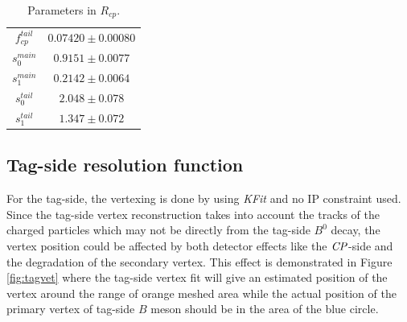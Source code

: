 \begin{table}[H]
	\begin{minipage}[b]{1.0\linewidth}
		\centering
		\caption{Parameters in $R_{cp}$.}
		\label{tab:Rcp}
		\begin{tabular}{|c|c|}
			\hline
			$f_{cp}^{tail}$ & $0.07420 \pm 0.00080$\\
			$s_0^{main}$&  $0.9151 \pm 0.0077$ \\
			$s_1^{main}$ & $0.2142\pm 0.0064$\\
			$s_0^{tail}$ &  $2.048\pm 0.078$\\
			$s_1^{tail}$  & $1.347\pm 0.072$ \\
			\hline
		\end{tabular}
	\end{minipage}
\end{table}

\subsection{Tag-side resolution function}

For the tag-side, the vertexing is done by using \textit{KFit} and no IP constraint used. Since the tag-side vertex reconstruction takes into account the tracks of the charged particles which may not be directly from the tag-side $B^0$ decay, the vertex position could be affected by both detector effects like the $\it{CP}$-side and the degradation of the secondary vertex. This effect is demonstrated in Figure \ref{fig:tagvet} where the tag-side vertex fit will give an estimated position of the vertex around the range of orange meshed area while the actual position of the primary vertex of tag-side $B$ meson should be in the area of the blue circle.

